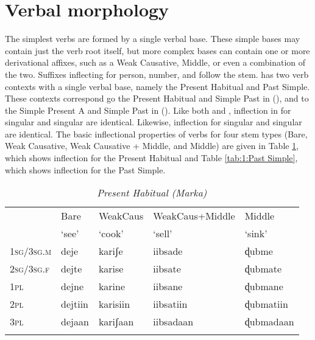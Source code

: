 \documentclass[output=paper]{../langsci/langscibook}
\begin{document}
 \section{Verbal morphology}
 
The simplest  verbs are formed by a single verbal base. These simple bases may contain just the verb root itself, but more complex bases can contain one or more derivational affixes, such as a Weak Causative, Middle, or even a combination of the two. Suffixes inflecting for person, number, and  follow the stem.  has two verb contexts with a single verbal base, namely the Present Habitual and Past Simple. These contexts correspond go the Present Habitual and Simple Past in  (\citealt{Greenetal2015}), and to the Simple Present A and Simple Past in  (\citealt{PasterRanero2015}). Like both  and , inflection in  for  singular and   singular are identical. Likewise, inflection for  singular and   singular are identical. The basic inflectional properties of  verbs for four stem types (Bare, Weak Causative, Weak Causative + Middle, and Middle) are given in Table \ref{tab:1:Present Habitual}, which shows inflection for the Present Habitual and Table \ref{tab:1:Past Simple}, which shows inflection for the Past Simple. 
 
 \begin{table}
 	\caption{\textit{Present Habitual (Marka)}}
 	\label{tab:1:Present Habitual}
 	\begin{tabularx}{\textwidth}{Xllll} 
 		\lsptoprule
 		& Bare   & WeakCaus  & WeakCaus+Middle & Middle   \\
 		& `see' & `cook' & `sell' & `sink' \\ 
 		\midrule
 		1\textsc{sg}/3\textsc{sg.m} & deje & kariʃe & iibsade & ɖubme \\
 		2\textsc{sg}/3\textsc{sg.f} & dejte  & karise & iibsate  & ɖubmate  \\
 		1\textsc{pl} & dejne & karine & iibsane & ɖubmane \\
 		2\textsc{pl} & dejtiin & karisiin & iibsatiin & ɖubmatiin \\
 		3\textsc{pl} & dejaan & kariʃaan & iibsadaan & ɖubmadaan \\
 	
 		\lspbottomrule
 	\end{tabularx}
 \end{table}
 
\end{document}
